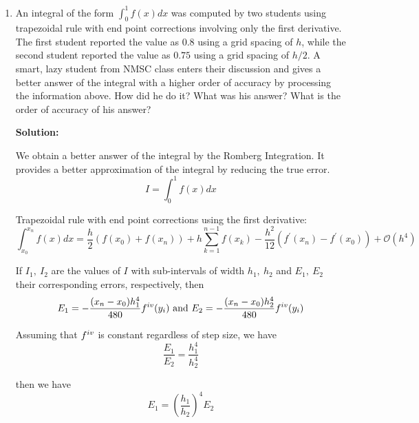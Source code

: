 \documentclass[a4paper,11pt]{report}
\begin{document}
\doublespacing
\begin{enumerate}

    \item An integral of the form $\displaystyle \int_{0}^{1} f(x) dx$ was computed
    by two students using trapezoidal rule with end point corrections involving only
    the first derivative. The first student reported the value as $0.8$ using a grid
    spacing of $h$, while the second student reported the value as $0.75$ using a grid
    spacing of $h/2$. A smart, lazy student from NMSC class enters their discussion
    and gives a better answer of the integral with a higher order of accuracy by processing
    the information above. How did he do it? What was his answer? What is the order of
    accuracy of his answer?

    \textbf{Solution:}
    
    We obtain a better answer of the integral by the Romberg Integration. It provides a better approximation of the integral by reducing the true error.
    \begin{equation*}
    I = \int_{0}^{1} f(x) dx
    \end{equation*}
    
    Trapezoidal rule with end point corrections using the first derivative:
    \begin{equation*}
    \int_{x_{0}}^{x_{n}} f(x) dx = \frac{h}{2} \left( f(x_{0}) + f(x_{n}) \right) + h \sum_{k=1}^{n-1} f(x_{k}) - \frac{h^{2}}{12} \left( f^{\prime}(x_{n}) - f^{\prime}(x_{0}) \right) + \mathcal{O}(h^{4})
    \end{equation*} 

    If $I_{1},\ I_{2}$ are the values of $I$ with sub-intervals of width $h_{1},\ h_{2}$ and $E_{1},\ E_{2}$ their corresponding errors, respectively, then
    \begin{equation*}
    E_{1} = - \frac{(x_{n} - x_{0})h_{1}^{4}}{480} f^{\romannumeral 4} (y_{i}) \ \text{and} \ E_{2} = - \frac{(x_{n} - x_{0})h_{2}^{4}}{480} f^{\romannumeral 4} (y_{i})
    \end{equation*}

    Assuming that $f^{\romannumeral 4}$ is constant regardless of step size, we have
    \begin{equation*}
    \frac{E_{1}}{E_{2}} = \frac{h_{1}^4}{h_{2}^4}
    \end{equation*}

    then we have
    \begin{equation*}
    E_{1} = \left( \frac{h_{1}}{h_{2}} \right)^{4} E_{2}
    \end{equation*}


\end{enumerate}
\end{document}

